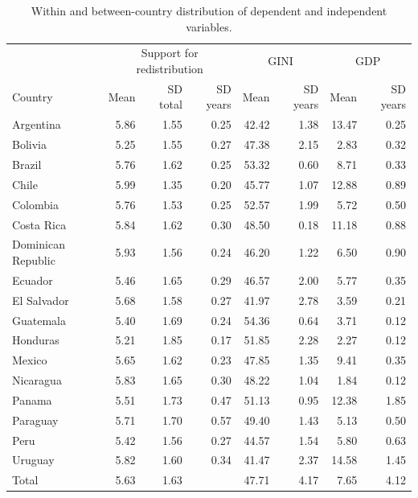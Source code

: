 \documentclass[utf8]{frontiersSCNS} %
\begin{document}
\begin{table}[h]
\centering
	\caption{Within and between-country distribution of dependent and independent variables.}
	\label{appendix2}
    \renewcommand{\arraystretch}{0.8}
\begin{tabular}{lrrrrrrr}
  \toprule
	 & \multicolumn{3}{c}{Support for redistribution} & \multicolumn{2}{c}{GINI} & \multicolumn{2}{c}{GDP} \\
    Country & Mean & SD total & SD years & Mean & SD years & Mean & SD years \\
  \midrule
  Argentina & 5.86 & 1.55 & 0.25 & 42.42 & 1.38 & 13.47 & 0.25 \\ 
  Bolivia & 5.25 & 1.55 & 0.27 & 47.38 & 2.15 & 2.83 & 0.32 \\ 
  Brazil & 5.76 & 1.62 & 0.25 & 53.32 & 0.60 & 8.71 & 0.33 \\ 
  Chile & 5.99 & 1.35 & 0.20 & 45.77 & 1.07 & 12.88 & 0.89 \\ 
  Colombia & 5.76 & 1.53 & 0.25 & 52.57 & 1.99 & 5.72 & 0.50 \\ 
  Costa Rica & 5.84 & 1.62 & 0.30 & 48.50 & 0.18 & 11.18 & 0.88 \\ 
  Dominican Republic & 5.93 & 1.56 & 0.24 & 46.20 & 1.22 & 6.50 & 0.90 \\ 
  Ecuador & 5.46 & 1.65 & 0.29 & 46.57 & 2.00 & 5.77 & 0.35 \\ 
  El Salvador & 5.68 & 1.58 & 0.27 & 41.97 & 2.78 & 3.59 & 0.21 \\ 
  Guatemala & 5.40 & 1.69 & 0.24 & 54.36 & 0.64 & 3.71 & 0.12 \\ 
  Honduras & 5.21 & 1.85 & 0.17 & 51.85 & 2.28 & 2.27 & 0.12 \\ 
  Mexico & 5.65 & 1.62 & 0.23 & 47.85 & 1.35 & 9.41 & 0.35 \\ 
  Nicaragua & 5.83 & 1.65 & 0.30 & 48.22 & 1.04 & 1.84 & 0.12 \\ 
  Panama & 5.51 & 1.73 & 0.47 & 51.13 & 0.95 & 12.38 & 1.85 \\ 
  Paraguay & 5.71 & 1.70 & 0.57 & 49.40 & 1.43 & 5.13 & 0.50 \\ 
  Peru & 5.42 & 1.56 & 0.27 & 44.57 & 1.54 & 5.80 & 0.63 \\ 
  Uruguay & 5.82 & 1.60 & 0.34 & 41.47 & 2.37 & 14.58 & 1.45 \\ 
  Total & 5.63 & 1.63 &  & 47.71 & 4.17 & 7.65 & 4.12 \\ 
		\bottomrule
	\end{tabular}
\end{table}
\end{document}
